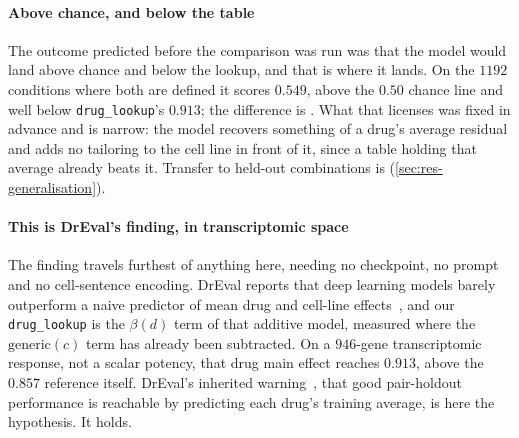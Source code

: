\begin{table}[htbp]
\end{table}

\paragraph{Above chance, and below the table} The outcome predicted before the
comparison was run was that the model would land above chance and below the
lookup, and that is where it lands. On the $\num{1192}$ conditions where both are
defined it scores $0.549$, above the $0.50$ chance line and well below
\texttt{drug\_lookup}'s $0.913$; the difference is
. What that licenses was fixed in advance and is
narrow: the model recovers something of a drug's average residual and adds no
tailoring to the cell line in front of it, since a table holding that average
already beats it. Transfer to held-out combinations is \notestablished
(\cref{sec:res-generalisation}). 

\paragraph{This is DrEval's finding, in transcriptomic space} The finding travels
furthest of anything here, needing no checkpoint, no prompt and no cell-sentence
encoding. DrEval reports that deep learning models barely outperform a naive
predictor of mean drug and cell-line effects~\cite{dreval}, and our
\texttt{drug\_lookup} is
the $\beta(d)$ term of that additive model, measured where the
$\textrm{generic}(c)$ term has already been
subtracted. On a $946$-gene transcriptomic response, not a scalar potency, that drug
main effect reaches $0.913$, above the $0.857$ reference itself. DrEval's
inherited warning~\cite{partin}, that good pair-holdout performance is reachable
by predicting each drug's training average, is here the hypothesis. It holds.


